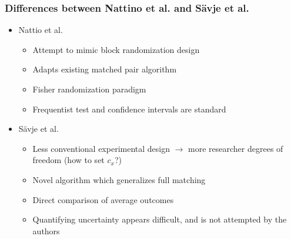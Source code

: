 
\begin{frame}
  \frametitle{Differences between Nattino et al. and S\"avje et al. }
  
  \begin{itemize}
  \item Nattio et al. \medskip 
    \begin{itemize}
    \item Attempt to mimic block randomization design \medskip 
    \item Adapts existing matched pair algorithm \medskip 
    \item Fisher randomization paradigm \medskip 
    \item Frequentist test and confidence intervals are standard \medskip 
    \end{itemize}
  \item S\"avje et al. \medskip 
    \begin{itemize}
    \item Less conventional experimental design $\rightarrow$ more
      researcher degrees of freedom (how to set $c_x$?) \medskip 
    \item Novel algorithm which generalizes full matching \medskip 
    \item Direct comparison of average outcomes \medskip 
    \item Quantifying uncertainty appears difficult, and is not
      attempted by the authors
    \end{itemize}
  \end{itemize}
  
\end{frame}



